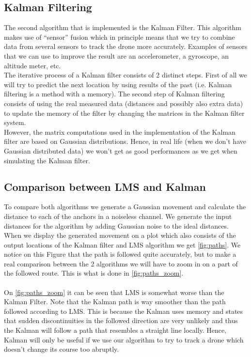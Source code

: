 \documentclass[a4paper]{article}        %
\begin{document}
	\subsection{Kalman Filtering}
	The second algorithm that is implemented is the Kalman Filter. This algorithm makes use of ``sensor'' fusion which in principle means that we try to combine data from several sensors to track the drone more accurately.
	Examples of sensors that we can use to improve the result are an accelerometer, a gyroscope, an altitude meter, etc.\\
	The iterative process of a Kalman filter consists of 2 distinct steps. First of all we will try to predict the next location by using results of the past (i.e. Kalman filtering is a method with a memory). 
	The second step of Kalman filtering consists of using the real measured data (distances and possibly also extra data) to update the memory of the filter by changing the matrices in the Kalman filter system.\\
	However, the matrix computations used in the implementation of the Kalman filter are based on Gaussian distributions. Hence, in real life (when we don't have Gaussian distributed data) we won't get as good performances as we get when simulating the Kalman filter.
	
\subsection{Comparison between LMS and Kalman}

To compare both algorithms we generate a Gaussian movement and calculate the distance to each of the anchors in a noiseless channel. We generate the input distances for the algorithm by adding Gaussian noise to the ideal distances.
When we display the generated movement on a plot which also consists of the output locations of the Kalman filter and LMS algorithm we get \autoref{fig:paths}.
We notice on this Figure that the path is followed quite accurately, but to make a real comparison between the 2 algorithms we will have to zoom in on a part of the followed route. This is what is done in \autoref{fig:paths_zoom}.	\\\\
On \autoref{fig:paths_zoom} it can be seen that LMS is somewhat worse than the Kalman Filter. Note that the Kalman path is way smoother than the path followed according to LMS. This is because the Kalman uses memory and states that sudden discontinuities in the followed direction are very unlikely and thus the Kalman will follow a path that resembles a straight line locally. Hence, Kalman will only be useful if we use our algorithm to try to track a drone which doesn't change its course too abruptly.
\end{document}

